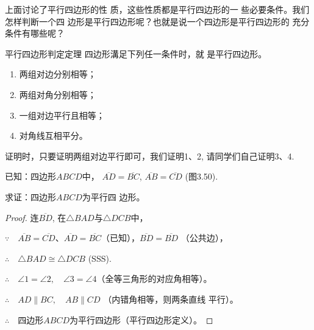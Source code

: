 上面讨论了平行四边形的性
质，这些性质都是平行四边形的一
些必要条件。我们怎样判断一个四
边形是平行四边形呢？也就是说一个四边形是平行四边形的
充分条件有哪些呢？

\begin{blk}
    {平行四边形判定定理} 四边形溝足下列任一条件时，就
是平行四边形。
\begin{enumerate}
\item 两组对边分别相等；
\item 两组对角分别相等；
\item 一组对边平行且相等；
\item 对角线互相平分。
\end{enumerate}
\end{blk}

证明时，只要证明两组对边平行即可，我们证明1、2, 请同学们自己证明3、4.

已知：四边形$ABCD$中，
$\overline{AD}=\overline{BC}$, $\overline{AB}=\overline{CD}$ (图3.50).

求证：四边形$ABCD$为平行四
边形。

\begin{proof}
    连$\overline{BD}$, 在$\triangle BAD$与$\triangle DCB$中，

$\because\quad     \overline{AB}=\overline{CD}$、$\overline{AD}=\overline{BC}$（已知），$\overline{BD}=\overline{BD}$ （公共边），

$\therefore\quad \triangle BAD\cong \triangle DCB$ (SSS).

$\therefore\quad \angle 1=\angle 2,\quad \angle 3=\angle 4$（全等三角形的对应角相等）。

$\therefore\quad AD\parallel BC,\quad AB\parallel CD$ （内错角相等，则两条直线
平行）。

$\therefore\quad $四边形$ABCD$为平行四边形（平行四边形定义）。
\end{proof}

\begin{figure}[htp]\centering
    \begin{minipage}[t]{0.48\textwidth}
    \centering
{}
    \caption{}
    \end{minipage}
    \begin{minipage}[t]{0.48\textwidth}
    \centering
    \caption{}
    \end{minipage}
    \end{figure}

